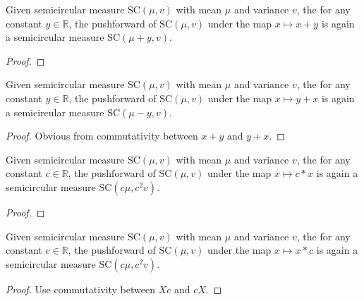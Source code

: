 
\begin{lemma}\label{lem:semicircleReal_map_add_const}
  \notready
  Given semicircular measure $\mathrm{SC}(\mu, v)$ with mean $\mu$ and variance $v$, the for any constant $y \in \mathbb{R}$, the pushforward
  of $\mathrm{SC}(\mu, v)$ under the map $x \mapsto x + y$ is again a semicircular measure $\mathrm{SC}(\mu + y, v)$. 
  \begin{proof}
  \end{proof}
\end{lemma}



\begin{lemma}\label{lem:semicircleReal_map_const_add}
  \mathlibok
  Given semicircular measure $\mathrm{SC}(\mu, v)$ with mean $\mu$ and variance $v$, the for any constant $y \in \mathbb{R}$, the pushforward
  of $\mathrm{SC}(\mu, v)$ under the map $x \mapsto y + x$ is again a semicircular measure $\mathrm{SC}(\mu - y, v)$. 
  \begin{proof}
    Obvious from commutativity between $x + y$ and $y + x$.
  \end{proof}
\end{lemma}



\begin{lemma}\label{lem:semicircleReal_map_const_mul}
  \notready
    Given semicircular measure $\mathrm{SC}(\mu, v)$ with mean $\mu$ and variance $v$, the for any constant $c \in \mathbb{R}$, the pushforward
  of $\mathrm{SC}(\mu, v)$ under the map $x \mapsto c * x$ is again a semicircular measure $\mathrm{SC}(c\mu, c^2v)$. 
  \begin{proof}
  \end{proof}
\end{lemma}



\begin{lemma}\label{lem:semicircleReal_map_mul_const}
  \mathlibok
   Given semicircular measure $\mathrm{SC}(\mu, v)$ with mean $\mu$ and variance $v$, the for any constant $c \in \mathbb{R}$, the pushforward
  of $\mathrm{SC}(\mu, v)$ under the map $x \mapsto x * c$ is again a semicircular measure $\mathrm{SC}(c\mu, c^2v)$. 
  \begin{proof}
    Use commutativity between $Xc$ and $cX$.
  \end{proof}
\end{lemma}



